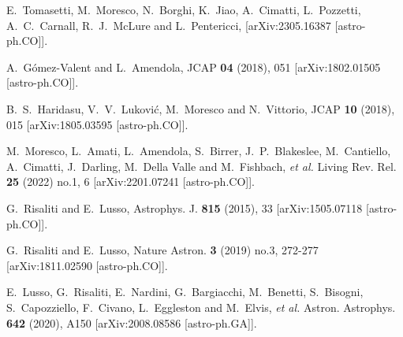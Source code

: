 \documentclass[aps,prl,10pt,twocolumn,superscriptaddress, nofootinbib]{revtex4}
\begin{document}
\begin{thebibliography}{99}
E.~Tomasetti, M.~Moresco, N.~Borghi, K.~Jiao, A.~Cimatti, L.~Pozzetti, A.~C.~Carnall, R.~J.~McLure and L.~Pentericci,
[arXiv:2305.16387 [astro-ph.CO]].

A.~G\'omez-Valent and L.~Amendola,
JCAP \textbf{04} (2018), 051
[arXiv:1802.01505 [astro-ph.CO]].

B.~S.~Haridasu, V.~V.~Lukovi\'c, M.~Moresco and N.~Vittorio,
JCAP \textbf{10} (2018), 015
[arXiv:1805.03595 [astro-ph.CO]].

M.~Moresco, L.~Amati, L.~Amendola, S.~Birrer, J.~P.~Blakeslee, M.~Cantiello, A.~Cimatti, J.~Darling, M.~Della Valle and M.~Fishbach, \textit{et al.}
Living Rev. Rel. \textbf{25} (2022) no.1, 6
[arXiv:2201.07241 [astro-ph.CO]].


G.~Risaliti and E.~Lusso,
Astrophys. J. \textbf{815} (2015), 33
[arXiv:1505.07118 [astro-ph.CO]].

G.~Risaliti and E.~Lusso,
Nature Astron. \textbf{3} (2019) no.3, 272-277
[arXiv:1811.02590 [astro-ph.CO]].

E.~Lusso, G.~Risaliti, E.~Nardini, G.~Bargiacchi, M.~Benetti, S.~Bisogni, S.~Capozziello, F.~Civano, L.~Eggleston and M.~Elvis, \textit{et al.}
Astron. Astrophys. \textbf{642} (2020), A150
[arXiv:2008.08586 [astro-ph.GA]].


\end{thebibliography}
\end{document}
